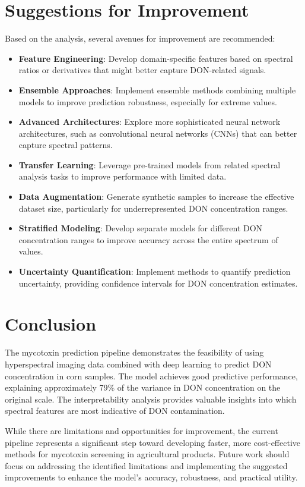 \documentclass{article}
\begin{document}
\section{Suggestions for Improvement}
Based on the analysis, several avenues for improvement are recommended:

\begin{itemize}
    \item \textbf{Feature Engineering}: Develop domain-specific features based on spectral ratios or derivatives that might better capture DON-related signals.
    
    \item \textbf{Ensemble Approaches}: Implement ensemble methods combining multiple models to improve prediction robustness, especially for extreme values.
    
    \item \textbf{Advanced Architectures}: Explore more sophisticated neural network architectures, such as convolutional neural networks (CNNs) that can better capture spectral patterns.
    
    \item \textbf{Transfer Learning}: Leverage pre-trained models from related spectral analysis tasks to improve performance with limited data.
    
    \item \textbf{Data Augmentation}: Generate synthetic samples to increase the effective dataset size, particularly for underrepresented DON concentration ranges.
    
    \item \textbf{Stratified Modeling}: Develop separate models for different DON concentration ranges to improve accuracy across the entire spectrum of values.
    
    \item \textbf{Uncertainty Quantification}: Implement methods to quantify prediction uncertainty, providing confidence intervals for DON concentration estimates.
\end{itemize}

\section{Conclusion}
The mycotoxin prediction pipeline demonstrates the feasibility of using hyperspectral imaging data combined with deep learning to predict DON concentration in corn samples. The model achieves good predictive performance, explaining approximately 79\% of the variance in DON concentration on the original scale. The interpretability analysis provides valuable insights into which spectral features are most indicative of DON contamination.

While there are limitations and opportunities for improvement, the current pipeline represents a significant step toward developing faster, more cost-effective methods for mycotoxin screening in agricultural products. Future work should focus on addressing the identified limitations and implementing the suggested improvements to enhance the model's accuracy, robustness, and practical utility.
\end{document}

